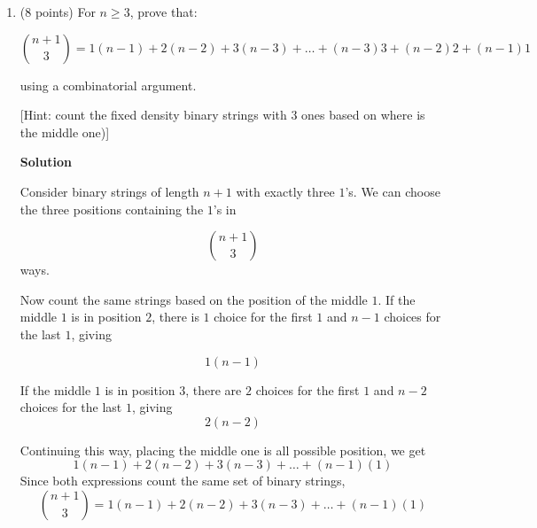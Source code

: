 \documentclass[10pt,letterpaper,unboxed,cm]{article}
\begin{document}
\begin{enumerate}
\begin{enumerate}
Consider choosing $k$ balls from $n$ distinct balls and marking one of the chosen balls.

One way is to first choose the $k$ balls. There are
\[\binom{n}{k}\]

ways to do this. Then, there are $k$ choices for which of the chosen balls to mark. Therefore, the number of ways is

\[k\binom{n}{k}\]

Another way is to first choose the marked ball. There are $n$ choices.
Then, we choose the remaining $k-1$ balls from the remaining $n-1$ balls.

There are
\[\binom{n-1}{k-1}\]
ways to do this. Therefore, the number of ways is
\[n\binom{n-1}{k-1}\]

Since both methods count the same set of $k$ chosen balls with one marked ball, we have
\[\boxed{k\binom{n}{k}=n\binom{n-1}{k-1}}\]


\item (8 points)
For $n\geq 3$, prove that:

$${n+1\choose 3} = 1(n-1) + 2(n-2) + 3(n-3) + \dots + (n-3)3 + (n-2)2 + (n-1)1
$$

using a combinatorial argument.

[Hint: count the fixed density binary strings with 3 ones based on where is the middle one)]

\textbf{Solution}

Consider binary strings of length $n+1$ with exactly three $1$'s.
We can choose the three positions containing the $1$'s in

\[\binom{n+1}{3}\]
ways.

Now count the same strings based on the position of the middle $1$.
If the middle $1$ is in position $2$, there is $1$ choice for the
first $1$ and $n-1$ choices for the last $1$, giving

\[1(n-1)\]

If the middle $1$ is in position $3$, there are $2$ choices for the
first $1$ and $n-2$ choices for the last $1$, giving
\[2(n-2)\]

Continuing this way, placing the middle one is all possible position, we get
\[1(n-1)+2(n-2)+3(n-3)+\dots+(n-1)(1)\]
Since both expressions count the same set of binary strings,
\[\boxed{\binom{n+1}{3}=1(n-1)+2(n-2)+3(n-3)+\dots+(n-1)(1)}\]

\end{enumerate}

\end{enumerate}
\end{document}
